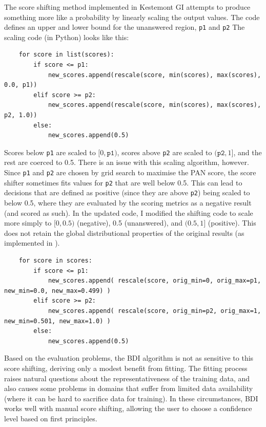 \documentclass[
    hf
]{ceurart}
\begin{document}
The score shifting method implemented in Kestemont GI attempts to produce something more like a
probability by linearly scaling the output values. The code defines an upper and lower bound for the
unanswered region, \texttt{p1} and \texttt{p2} The scaling code (in Python) looks like this:

\begin{verbatim}
    for score in list(scores):
        if score <= p1:
            new_scores.append(rescale(score, min(scores), max(scores), 0.0, p1))
        elif score >= p2:
            new_scores.append(rescale(score, min(scores), max(scores), p2, 1.0))
        else:
            new_scores.append(0.5)
\end{verbatim}

Scores below \texttt{p1} are scaled to $[0,\texttt{p1})$, scores above \texttt{p2} are scaled to
$(\texttt{p2},1]$, and the rest are coerced to 0.5. There is an issue with this scaling algorithm,
however. Since \texttt{p1} and \texttt{p2} are chosen by grid search to maximise the PAN score, the
score shifter sometimes fits values for \texttt{p2} that are well below 0.5. This can lead to
decisions that are defined as positive (since they are above \texttt{p2}) being scaled to below 0.5,
where they are evaluated by the scoring metrics as a negative result (and scored as such). In the
updated code, I modified the shifting code to scale more simply to $[0,0.5)$ (negative), 0.5
(unanswered), and $(0.5,1]$ (positive). This does not retain the global distributional properties of
the original results (as implemented in \cite{kestemont_caesar}).

\begin{verbatim}
    for score in scores: 
        if score <= p1: 
            new_scores.append( rescale(score, orig_min=0, orig_max=p1, new_min=0.0, new_max=0.499) ) 
        elif score >= p2: 
            new_scores.append( rescale(score, orig_min=p2, orig_max=1, new_min=0.501, new_max=1.0) )
        else: 
            new_scores.append(0.5)
\end{verbatim}

Based on the evaluation problems, the BDI algorithm is not as sensitive to this score shifting,
deriving only a modest benefit from fitting. The fitting process raises natural questions about the
representativeness of the training data, and also causes some problems in domains that suffer from
limited data availability (where it can be hard to sacrifice data for training). In these
circumstances, BDI works well with manual score shifting, allowing the user to choose a confidence
level based on first principles.
\end{document}
